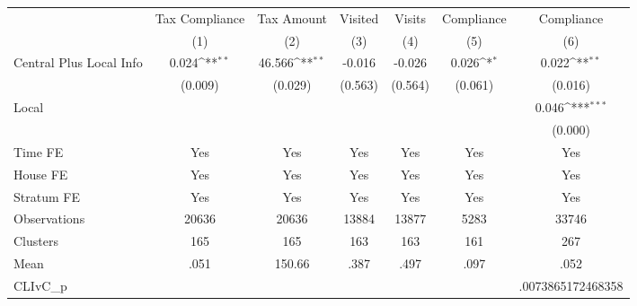 {
\def\sym#1{\ifmmode^{#1}\else\(^{#1}\)\fi}
\begin{tabular}{l*{6}{c}}
\toprule
                &\multicolumn{1}{c}{Tax Compliance}&\multicolumn{1}{c}{Tax Amount}&\multicolumn{1}{c}{Visited}&\multicolumn{1}{c}{Visits}&\multicolumn{1}{c}{Compliance}&\multicolumn{1}{c}{Compliance}\\
                &\multicolumn{1}{c}{(1)}         &\multicolumn{1}{c}{(2)}         &\multicolumn{1}{c}{(3)}         &\multicolumn{1}{c}{(4)}         &\multicolumn{1}{c}{(5)}         &\multicolumn{1}{c}{(6)}         \\
\midrule
Central Plus Local Info&    0.024\sym{**} &   46.566\sym{**} &   -0.016         &   -0.026         &    0.026\sym{*}  &    0.022\sym{**} \\
                &  (0.009)         &  (0.029)         &  (0.563)         &  (0.564)         &  (0.061)         &  (0.016)         \\
Local           &                  &                  &                  &                  &                  &    0.046\sym{***}\\
                &                  &                  &                  &                  &                  &  (0.000)         \\
Time FE         &      Yes         &      Yes         &      Yes         &      Yes         &      Yes         &      Yes         \\
House FE        &      Yes         &      Yes         &      Yes         &      Yes         &      Yes         &      Yes         \\
Stratum FE      &      Yes         &      Yes         &      Yes         &      Yes         &      Yes         &      Yes         \\
\midrule
Observations    &    20636         &    20636         &    13884         &    13877         &     5283         &    33746         \\
Clusters        &      165         &      165         &      163         &      163         &      161         &      267         \\
Mean            &     .051         &   150.66         &     .387         &     .497         &     .097         &     .052         \\
CLIvC\_p         &                  &                  &                  &                  &                  &.0073865172468358         \\
\bottomrule
\end{tabular}
}
